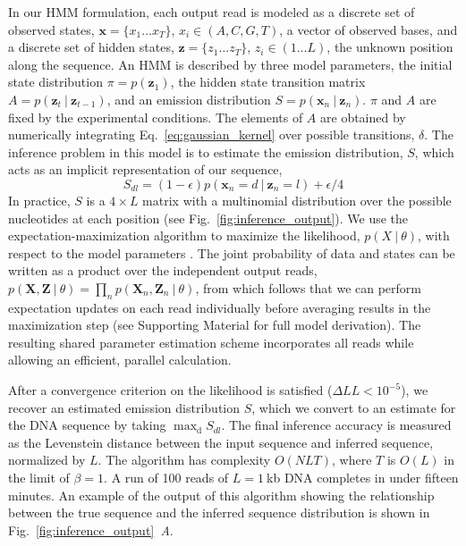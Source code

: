 \documentclass{biophys_letter}
\newcommand{\bias}{\beta}
\newcommand{\err}{\epsilon}
\newcommand{\kje}[1]{\textcolor{BurntOrange}{#1}}
\begin{document}
In our HMM formulation, each output read is modeled as a discrete set of observed states, $\mathbf{x}=\{x_{1}\dots x_{T}\}$, $x_i \in (A,C,G,T)$, a vector of observed bases, and a discrete set of hidden states, $\mathbf{z}=\{z_{1} \dots z_{T}\}$, $z_i \in (1 \dots L)$, the unknown position along the sequence.
An HMM is described by three model parameters, the initial state distribution $\pi=p(\mathbf{z}_{1})$, the hidden state transition matrix $A=p(\mathbf{z}_{t}\:|\:\mathbf{z}_{t-1})$, and an emission distribution $S=p(\mathbf{x}_{n}\:|\:\mathbf{z}_{n})$.
$\pi$ and $A$ are fixed by the experimental conditions.
\kje{The elements of $A$ are obtained by numerically integrating Eq.~\ref{eq:gaussian_kernel} over possible transitions, $\delta$.}
The inference problem in this model is to estimate the emission distribution, $S$, which acts as an implicit representation of our sequence,
\begin{equation}
  S_{dl} = (1-\err)p(\mathbf{x}_n = d\:|\:\mathbf{z}_{n} = l) + \err/4
\end{equation}
In practice, $S$ is a $4 \times L$ matrix with a multinomial distribution over the possible nucleotides at each position (see Fig.~\ref{fig:inference_output}).
\kje{We use the expectation-maximization algorithm to maximize the likelihood, $p(X \:|\: \theta)$, with respect to the model parameters \cite{Baum:1970}.}
The joint probability of data and states can be written as a product over the independent output reads, $p(\mathbf{X},\mathbf{Z}\:|\:\theta)=\prod_{n}p(\mathbf{X}_n,\mathbf{Z}_n\:|\:\theta)$, from which follows that we can perform expectation updates on each read individually before averaging results in the maximization step (see Supporting Material for full model derivation).
The resulting shared parameter estimation scheme incorporates all reads while allowing an efficient, parallel calculation.

After a convergence criterion on the likelihood is satisfied (${\Delta}LL<10^{-5}$), we recover an estimated emission distribution $S$, which we convert to an estimate for the DNA sequence by taking $\mathrm{\max_{d}} {S_{dl}}$.
The final inference accuracy is measured as the Levenstein distance between the input sequence and inferred sequence, normalized by $L$.
The algorithm has complexity $O(NLT)$, where $T$ is $O(L)$ in the limit of $\bias=1$.
\kje{A run of 100 reads of $L=1\:$kb DNA completes in under fifteen minutes.}
An example of the output of this algorithm showing the relationship between the true sequence and the inferred sequence distribution is shown in Fig.~\ref{fig:inference_output}\emph{~A}.
\end{document}
